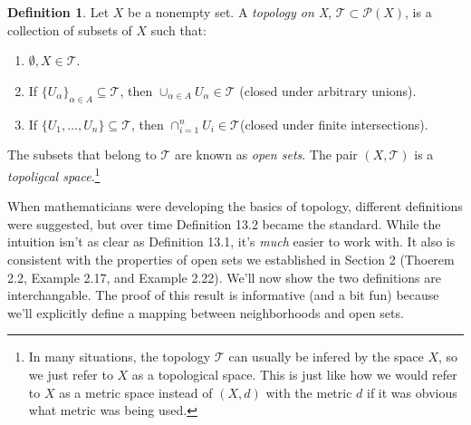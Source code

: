 \documentclass{article}
\theoremstyle{definition}
\newtheorem{definition}{Definition}[section]
\begin{document}
	\begin{definition}\label{def13.2}
		Let $X$ be a nonempty set. A \textit{\color{red}topology on X}, $\mathcal T \subset \mathcal P(X)$, is a collection of subsets of $X$ such that:
		\begin{enumerate}
			\item $\emptyset, X\in \mathcal T$.
			\item If $\{U_\alpha\}_{\alpha \in A}\subseteq \mathcal T$, then $\cup_{\alpha \in A}U_\alpha \in \mathcal T$ (closed under arbitrary unions).
			\item If $\{U_1,\ldots,U_n\} \subseteq \mathcal T$, then $ \cap_{i=1}^n U_i \in \mathcal T$(closed under finite intersections).
		\end{enumerate}
	The subsets that belong to $\mathcal T$ are known as \textit{\color{red}open sets}. The pair $(X,\mathcal{T})$ is a \textit{\color{red}topoligcal space}.\footnote{In many situations, the topology $\mathcal T$ can usually be infered by the space $X$, so we just refer to $X$ as a topological space. This is just like how we would refer to $X$ as a metric space instead of $(X,d)$ with the metric $d$ if it was obvious what metric was being used.} 
	\end{definition}

	When mathematicians were developing the basics of topology, different definitions were suggested, but over time Definition 13.2 became the standard. While the intuition isn't as clear as Definition 13.1, it's \textit{much} easier to work with.  It also is consistent with the properties of open sets we established in Section 2 (Thoerem 2.2, Example 2.17, and Example 2.22). We'll now show the two definitions are interchangable. The proof of this result is informative (and a bit fun) because we'll explicitly define a mapping between neighborhoods and open sets.
\end{document}
